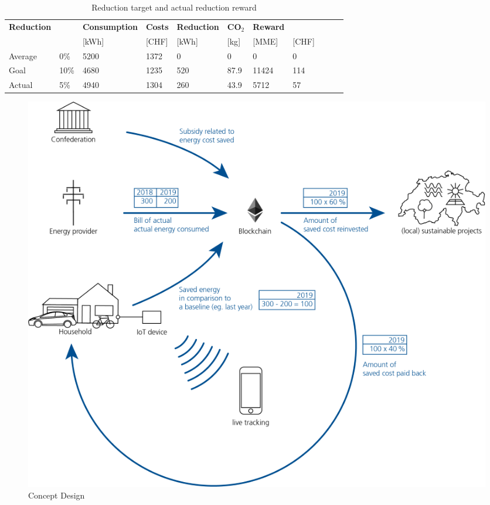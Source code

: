 \documentclass[11pt]{article}
\begin{document}
\begin{table}[H]
\begin{tabular}{ll|llllll|lll}
\textbf{Reduction} & \textbf{} & \textbf{Consumption} & \textbf{Costs} & \textbf{Reduction} & \textbf{CO$_2$} & \textbf{Reward} &           \\
                   &           & {[}kWh{]}            & {[}CHF{]}      & {[}kWh{]}          & {[}kg{]}     & {[}MME{]}       & {[}CHF{]} \\ \hline
Average             & 0\%      & 5200                 & 1372            & 0                & 0        & 0           & 0       \\
Goal             & 10\%      & 4680                 & 1235            & 520                & 87.9         & 11424           & 114       \\
Actual             & 5\%       & 4940                 & 1304            & 260                & 43.9          & 5712            & 57
\end{tabular}
\caption{Reduction target and actual reduction reward}
\label{table_target-actual}
\end{table}

\begin{figure}
	\begin{center}
		\includegraphics[scale=1.5]{../presentation/concept.png}
		\caption{Concept Design}
		\label{img_concept}
	\end{center}
\end{figure}
\end{document}
